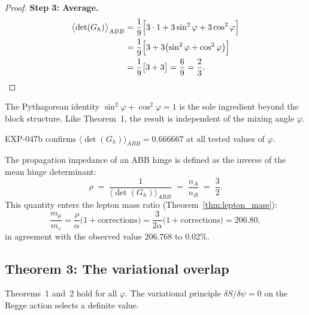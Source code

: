 \begin{proof}
\medskip\noindent\textbf{Step 3: Average.}
\begin{align}
\bigl\langle \det(G_h) \bigr\rangle_{ABB}
&= \frac{1}{9}\Bigl[3 \cdot 1 + 3\sin^2\varphi + 3\cos^2\varphi\Bigr]
\notag\\
&= \frac{1}{9}\Bigl[3 + 3\bigl(\sin^2\varphi + \cos^2\varphi\bigr)\Bigr]
\notag\\
&= \frac{1}{9}\bigl[3 + 3\bigr]
= \frac{6}{9} = \frac{2}{3}. \qedhere
\end{align}
\end{proof}

\begin{remark}[Universality]
The Pythagorean identity $\sin^2\varphi + \cos^2\varphi = 1$ is the
sole ingredient beyond the block structure.  Like Theorem~1, the
result is independent of the mixing angle $\varphi$.
\end{remark}

\begin{remark}
EXP-047b confirms $\langle\det(G_h)\rangle_{ABB} = 0.666667$ at all
tested values of $\varphi$.
\end{remark}

\begin{corollary}\label{cor:impedance}
The propagation impedance of an ABB hinge is defined as the inverse of
the mean hinge determinant:
\begin{equation}
\rho \;=\; \frac{1}{\langle\det(G_h)\rangle_{ABB}}
\;=\; \frac{n_A}{n_B} \;=\; \frac{3}{2}.
\end{equation}
This quantity enters the lepton mass ratio
(Theorem~\ref{thm:lepton_mass}):
\begin{equation}
\frac{m_\mu}{m_e} = \frac{\rho}{\alpha}
\bigl(1 + \text{corrections}\bigr)
= \frac{3}{2\alpha}
\bigl(1 + \text{corrections}\bigr)
= 206.80,
\end{equation}
in agreement with the observed value $206.768$ to $0.02\%$.
\end{corollary}

\subsection{Theorem 3: The variational overlap}
\label{sec:thm_overlap}

Theorems~1 and~2 hold for all $\varphi$.  The variational principle
$\delta S / \delta\psi = 0$ on the Regge action selects a definite
value.

